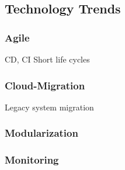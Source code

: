 \subsection{Technology Trends} 

\subsubsection{Agile}
CD, CI
Short life cycles

\subsubsection{Cloud-Migration}

Legacy system migration

\subsubsection{Modularization}

\subsubsection{Monitoring}


